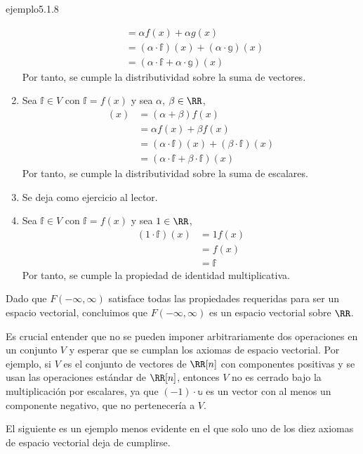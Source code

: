 \begin{examplebox}{}{ejemplo5.1.8}
\begin{enumerate}[label=\roman*), topsep=6pt, itemsep=0pt]
\begin{align*}
            & = \alpha f(x) + \alpha g(x) \\
            & = (\alpha \cdot \mathbb{f})(x) + (\alpha \cdot \mathbb{g})(x) \\
            & = (\alpha \cdot \mathbb{f} + \alpha \cdot \mathbb{g})(x)
        \end{align*}
        Por tanto, se cumple la distributividad sobre la suma de vectores.
        \item Sea $\mathbb{f} \in V$ con $\mathbb{f} = f(x)$ y sea $\alpha$, $\beta \in \RR$,
        \begin{align*}
            [(\alpha + \beta) \cdot \mathbb{f}](x) & = (\alpha + \beta) f(x) \\
            & = \alpha f(x) + \beta f(x) \\
            & = (\alpha \cdot \mathbb{f})(x) + (\beta \cdot \mathbb{f})(x) \\
            & = (\alpha \cdot \mathbb{f} + \beta \cdot \mathbb{f})(x)
        \end{align*}
        Por tanto, se cumple la distributividad sobre la suma de escalares.
        \item Se deja como ejercicio al lector.
        \item Sea $\mathbb{f} \in V$ con $\mathbb{f} = f(x)$ y sea $1 \in \RR$,
        \begin{align*}
            (1 \cdot \mathbb{f})(x) & = 1 f(x) \\
            & = f(x) \\
            & = \mathbb{f}
        \end{align*}
        Por tanto, se cumple la propiedad de identidad multiplicativa.
    \end{enumerate}
    Dado que $F(-\infty, \infty)$ satisface todas las propiedades requeridas para ser un espacio vectorial, concluimos que $F(-\infty, \infty)$ es un espacio vectorial sobre $\RR$.
\end{examplebox}

Es crucial entender que no se pueden imponer arbitrariamente dos operaciones en un conjunto $V$ y esperar que se cumplan los axiomas de espacio vectorial. Por ejemplo, si $V$ es el conjunto de vectores de $\RR[n]$ con componentes positivas y se usan las operaciones estándar de $\RR[n]$, entonces $V$ no es cerrado bajo la multiplicación por escalares, ya que $(-1) \cdot \mathbb{u}$ es un vector con al menos un componente negativo, que no pertenecería a $V$.

El siguiente es un ejemplo menos evidente en el que solo uno de los diez axiomas de espacio vectorial deja de cumplirse.


